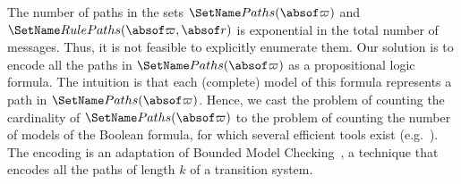 

The number of paths in the sets $\AbsPaths{\abstrace}$ and
$\AbsPathsRule{\abstrace}{\absrule}$ is exponential in the total
number of messages.
%
Thus, it is not feasible to explicitly enumerate them.
%
Our solution is to encode all the paths in
$\AbsPaths{\abstrace}$ as a propositional logic formula.
The intuition is that each (complete) model of this formula
represents a path in $\AbsPaths{\abstrace}$.
%
Hence, we cast the problem of counting the cardinality of
$\AbsPaths{\abstrace}$ to the problem of counting the number of
models of the Boolean formula, for which several
efficient tools exist (e.g.~\cite{sharpsattool}).
%
The encoding is an adaptation of Bounded Model Checking~\cite{bmc},
a technique that encodes all the paths of length $k$ of a transition
system.



